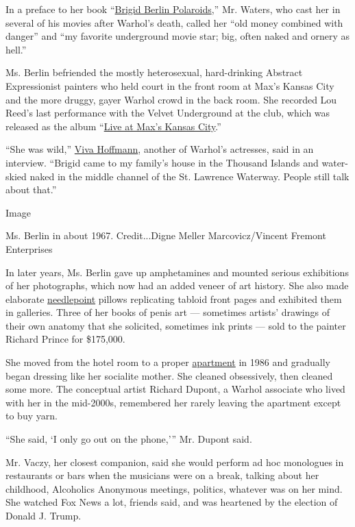 In a preface to her book
``\href{https://www.reelartpress.com/catalog/edition/82/brigid-berlin-polaroids}{Brigid
Berlin Polaroids},'' Mr. Waters, who cast her in several of his movies
after Warhol's death, called her ``old money combined with danger'' and
``my favorite underground movie star; big, often naked and ornery as
hell.''

Ms. Berlin befriended the mostly heterosexual, hard-drinking Abstract
Expressionist painters who held court in the front room at Max's Kansas
City and the more druggy, gayer Warhol crowd in the back room. She
recorded Lou Reed's last performance with the Velvet Underground at the
club, which was released as the album
``\href{https://www.rollingstone.com/music/music-album-reviews/live-at-maxs-kansas-city-94148/}{Live
at Max's Kansas City}.''

``She was wild,''
\href{https://www.nytimes.com/2017/09/27/fashion/viva-andy-warhol.html}{Viva
Hoffmann}, another of Warhol's actresses, said in an interview. ``Brigid
came to my family's house in the Thousand Islands and water-skied naked
in the middle channel of the St. Lawrence Waterway. People still talk
about that.''

Image

Ms. Berlin in about 1967. Credit...Digne Meller Marcovicz/Vincent
Fremont Enterprises

In later years, Ms. Berlin gave up amphetamines and mounted serious
exhibitions of her photographs, which now had an added veneer of art
history. She also made elaborate
\href{https://glennhorowitz.com/events/brigid-berlin-needlepoint/}{needlepoint}
pillows replicating tabloid front pages and exhibited them in galleries.
Three of her books of penis art --- sometimes artists' drawings of their
own anatomy that she solicited, sometimes ink prints --- sold to the
painter Richard Prince for \$175,000.

She moved from the hotel room to a proper
\href{https://www.nytimes.com/2001/04/22/movies/film-a-warholian-finds-a-new-center-of-gravity.html}{apartment}
in 1986 and gradually began dressing like her socialite mother. She
cleaned obsessively, then cleaned some more. The conceptual artist
Richard Dupont, a Warhol associate who lived with her in the mid-2000s,
remembered her rarely leaving the apartment except to buy yarn.

``She said, `I only go out on the phone,''' Mr. Dupont said.

Mr. Vaczy, her closest companion, said she would perform ad hoc
monologues in restaurants or bars when the musicians were on a break,
talking about her childhood, Alcoholics Anonymous meetings, politics,
whatever was on her mind. She watched Fox News a lot, friends said, and
was heartened by the election of Donald J. Trump.


